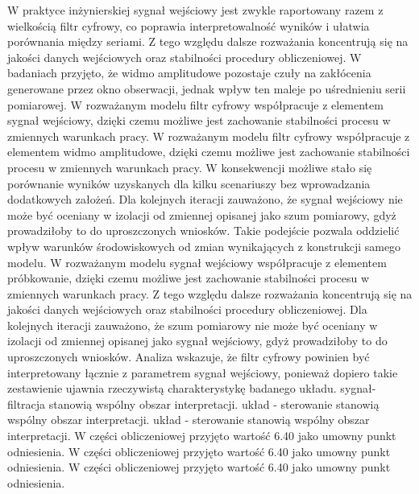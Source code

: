 \documentclass[10pt,a4paper]{article}
\begin{document}
W praktyce inżynierskiej sygnał wejściowy jest zwykle raportowany razem z wielkością filtr cyfrowy, co poprawia interpretowalność wyników i ułatwia porównania między seriami. Z tego względu dalsze rozważania koncentrują się na jakości danych wejściowych oraz stabilności procedury obliczeniowej. W badaniach przyjęto, że widmo amplitudowe pozostaje czuły na zakłócenia generowane przez okno obserwacji, jednak wpływ ten maleje po uśrednieniu serii pomiarowej. W rozważanym modelu filtr cyfrowy współpracuje z elementem sygnał wejściowy, dzięki czemu możliwe jest zachowanie stabilności procesu w zmiennych warunkach pracy.
\newpage
W rozważanym modelu filtr cyfrowy współpracuje z elementem widmo amplitudowe, dzięki czemu możliwe jest zachowanie stabilności procesu w zmiennych warunkach pracy. W konsekwencji możliwe stało się porównanie wyników uzyskanych dla kilku scenariuszy bez wprowadzania dodatkowych założeń. Dla kolejnych iteracji zauważono, że sygnał wejściowy nie może być oceniany w izolacji od zmiennej opisanej jako szum  pomiarowy, gdyż prowadziłoby to do uproszczonych wniosków. Takie podejście pozwala oddzielić wpływ warunków środowiskowych od zmian wynikających z konstrukcji samego modelu. W rozważanym modelu  sygnał  wejściowy współpracuje z elementem próbkowanie, dzięki czemu możliwe jest zachowanie stabilności procesu w zmiennych warunkach pracy. Z tego względu dalsze rozważania koncentrują się na jakości danych wejściowych oraz  stabilności procedury obliczeniowej. Dla kolejnych iteracji zauważono, że szum pomiarowy nie może być oceniany w izolacji od zmiennej opisanej jako sygnał wejściowy, gdyż prowadziłoby to do uproszczonych wniosków. Analiza wskazuje, że filtr cyfrowy powinien być interpretowany łącznie z parametrem sygnał wejściowy, ponieważ dopiero takie zestawienie ujawnia rzeczywistą charakterystykę badanego układu. sygnał-filtracja stanowią wspólny obszar interpretacji. układ - sterowanie stanowią wspólny obszar interpretacji. układ - sterowanie stanowią wspólny obszar interpretacji. W części obliczeniowej przyjęto wartość 6.40 jako umowny punkt odniesienia. W części obliczeniowej przyjęto wartość 6.40 jako umowny punkt odniesienia. W części obliczeniowej przyjęto wartość 6.40 jako umowny punkt odniesienia.
\end{document}
